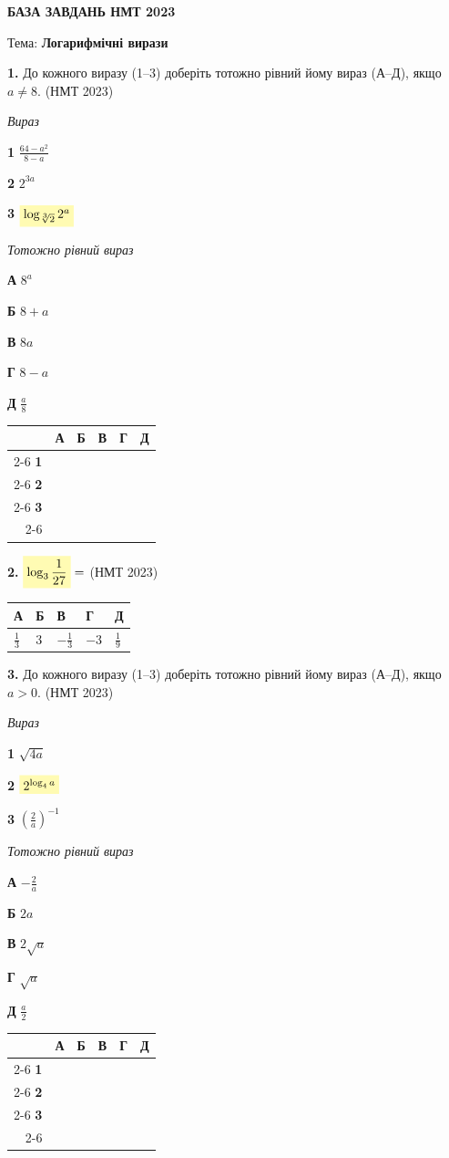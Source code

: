 \documentclass[14pt]{extarticle}
\newcommand{\answerGrid}{
    \begingroup
    \renewcommand{\arraystretch}{1.3} 
    \setlength{\tabcolsep}{7pt} 
    \begin{tabular}{r|c|c|c|c|c|}
         \multicolumn{1}{c}{} & \multicolumn{1}{c}{\textbf{А}} & \multicolumn{1}{c}{\textbf{Б}} & \multicolumn{1}{c}{\textbf{В}} & \multicolumn{1}{c}{\textbf{Г}} & \multicolumn{1}{c}{\textbf{Д}} \\ \cline{2-6}
         \textbf{1} & & & & & \\ \cline{2-6}
         \textbf{2} & & & & & \\ \cline{2-6}
         \textbf{3} & & & & & \\ \cline{2-6}
    \end{tabular}
    \endgroup
}
\newcommand{\matchingLayout}[3]{
    \noindent
    \begin{minipage}[t]{0.40\textwidth}
        #1
    \end{minipage}%
    \hfill
    \begin{minipage}[t]{0.28\textwidth}
        #2
    \end{minipage}%
    \hfill
    \begin{minipage}[t]{0.30\textwidth}
        \vspace{0pt}
        \begin{flushright}
        #3
        \end{flushright}
    \end{minipage}
}
\newcommand{\answerTableTall}[5]{
\begin{center}
\begin{tabular}{|*{5}{>{\centering\arraybackslash}m{2.8cm}|}}
\hline
\rule[-0.3cm]{0pt}{0.8cm}\textbf{А} & \textbf{Б} & \textbf{В} & \textbf{Г} & \textbf{Д} \\
\hline
\rule[-0.9cm]{0pt}{2.0cm}#1 & 
\rule[-0.9cm]{0pt}{2.0cm}#2 & 
\rule[-0.9cm]{0pt}{2.0cm}#3 & 
\rule[-0.9cm]{0pt}{2.0cm}#4 & 
\rule[-0.9cm]{0pt}{2.0cm}#5 \\
\hline
\end{tabular}
\end{center}
}
\newcommand{\nmtyear}[1]{\hfill{\small\color{yearcolor}(НМТ #1)}}
\begin{document}
\vspace{1cm}

\begin{center}
{\Large\textbf{\color{headerblue}БАЗА ЗАВДАНЬ НМТ 2023}}
\end{center}

\begin{center}
{\large Тема: \textbf{Логарифмічні вирази}}
\end{center}

\vspace{0.5cm}


\noindent\textbf{1.} До кожного виразу (1--3) доберіть тотожно рівний йому вираз (А--Д), якщо $a \neq 8$. \nmtyear{2023}
\vspace{0.3cm}

\matchingLayout{
\textit{Вираз}

\textbf{1} \quad $\displaystyle\frac{64 - a^2}{8 - a}$

\textbf{2} \quad $2^{3a}$

\textbf{3} \quad $\colorbox{yellow!30}{$\log_{\sqrt[3]{2}} 2^a$}$
}{
\textit{Тотожно рівний вираз}

\textbf{А} \quad $8^a$

\textbf{Б} \quad $8 + a$

\textbf{В} \quad $8a$

\textbf{Г} \quad $8 - a$

\textbf{Д} \quad $\displaystyle\frac{a}{8}$
}{
\answerGrid
}

\vspace{0.8cm}

\noindent\textbf{2.} $\colorbox{yellow!30}{$\log_3 \dfrac{1}{27}$} = $ \nmtyear{2023}
\vspace{0.3cm}

\answerTableTall{$\displaystyle\frac{1}{3}$}{$3$}{$-\displaystyle\frac{1}{3}$}{$-3$}{$\displaystyle\frac{1}{9}$}

\vspace{0.5cm}

\noindent\textbf{3.} До кожного виразу (1--3) доберіть тотожно рівний йому вираз (А--Д), якщо $a > 0$. \nmtyear{2023}
\vspace{0.3cm}

\matchingLayout{
\textit{Вираз}

\textbf{1} \quad $\sqrt{4a}$

\textbf{2} \quad $\colorbox{yellow!30}{$2^{\log_4 a}$}$

\textbf{3} \quad $\left(\displaystyle\frac{2}{a}\right)^{-1}$
}{
\textit{Тотожно рівний вираз}

\textbf{А} \quad $-\displaystyle\frac{2}{a}$

\textbf{Б} \quad $2a$

\textbf{В} \quad $2\sqrt{a}$

\textbf{Г} \quad $\sqrt{a}$

\textbf{Д} \quad $\displaystyle\frac{a}{2}$
}{
\answerGrid
}
\end{document}
